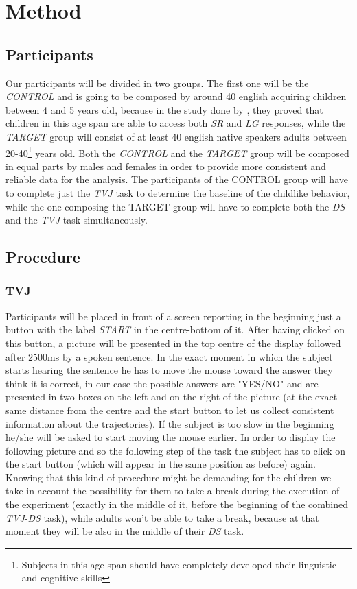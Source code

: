 \documentclass[10pt, a4]{article}
\begin{document}
\section{Method}
\subsection{Participants}
Our participants will be divided in two groups. The first one will be the \textit{CONTROL} and is going to be composed by around 40
english acquiring children between 4 and 5 years old, because in the study done by \cite{minai2012hinders}, they
proved that children in this age span are able to access both \textit{SR} and \textit{LG} responses, while the \textit{TARGET} group will consist
of at least 40 english native speakers adults between 20-40\footnote{Subjects in this age span should have completely developed
their linguistic and cognitive skills} years old. Both the \textit{CONTROL} and the \textit{TARGET} group will be composed in equal
parts by males and females in order to provide more consistent and reliable data for the analysis.
The participants of the CONTROL group will have to complete just the \textit{TVJ} task to determine the baseline of the childlike behavior,
while the one composing the TARGET group will have to complete both the \textit{DS} and the \textit{TVJ} task simultaneously.\\

\subsection{Procedure}
\subsubsection{TVJ}
Participants will be placed in front of a screen reporting in the beginning just a button with the label \textit{START}
in the centre-bottom of it. After having clicked on this button, a picture will be presented in the top centre of the
display followed after 2500ms by a spoken sentence. In the exact moment in which the subject starts hearing the sentence
he has to move the mouse toward the answer they think it is correct, in our case the possible answers are "YES/NO"
and are presented in two boxes on the left and on the right of the picture (at the exact same distance from the centre and the start button
to let us collect consistent information about the trajectories). If the subject is too slow in the beginning he/she will be asked to
start moving the mouse earlier. In order to display the following picture and so the following step of the task the subject has to click
on the start button (which will appear in the same position as before) again. Knowing that this kind of procedure might be demanding
for the children we take in account the possibility for them to take a break during the execution of the experiment (exactly in the middle of it, before
the beginning of the combined \textit{TVJ}-\textit{DS} task), while adults won't be able to take a break, because at that moment
they will be also in the middle of their \textit{DS} task.
\end{document}
